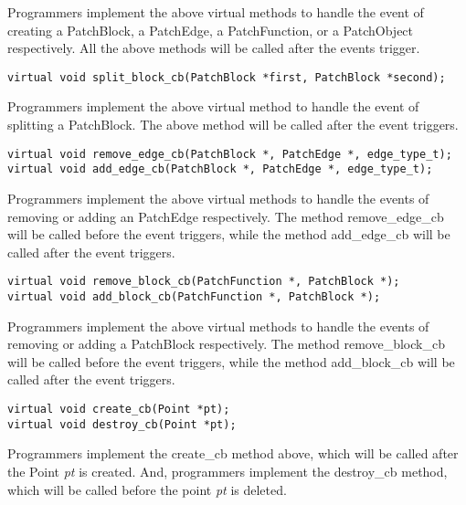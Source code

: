 Programmers implement the above virtual methods to handle the event of creating
a PatchBlock, a PatchEdge, a PatchFunction, or a PatchObject respectively. All
the above methods will be called after the events trigger.


\begin{verbatim}
virtual void split_block_cb(PatchBlock *first, PatchBlock *second);

\end{verbatim}



Programmers implement the above virtual method to handle the event of splitting
a PatchBlock. The above method will be called after the event triggers.


\begin{verbatim}
virtual void remove_edge_cb(PatchBlock *, PatchEdge *, edge_type_t);
virtual void add_edge_cb(PatchBlock *, PatchEdge *, edge_type_t);

\end{verbatim}



Programmers implement the above virtual methods to handle the events of removing
or adding an PatchEdge respectively. The method remove\_edge\_cb will be called
before the event triggers, while the method add\_edge\_cb will be called after
the event triggers.


\begin{verbatim}
virtual void remove_block_cb(PatchFunction *, PatchBlock *);
virtual void add_block_cb(PatchFunction *, PatchBlock *);

\end{verbatim}



Programmers implement the above virtual methods to handle the events of removing
or adding a PatchBlock respectively. The method remove\_block\_cb will be called
before the event triggers, while the method add\_block\_cb will be called after
the event triggers.


\begin{verbatim}
virtual void create_cb(Point *pt);
virtual void destroy_cb(Point *pt);

\end{verbatim}



Programmers implement the create\_cb method above, which will be called after
the Point \emph{pt} is created. And, programmers implement the destroy\_cb method,
which will be called before the point \emph{pt} is deleted.


